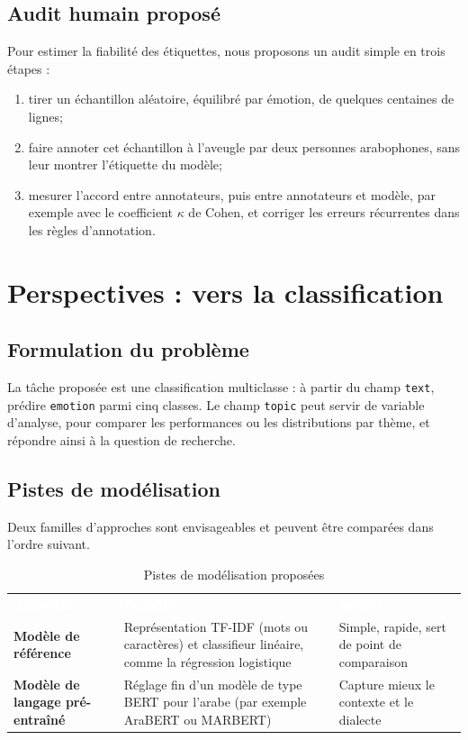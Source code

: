 \documentclass[11pt,a4paper]{article}
\newcommand{\headtab}[1]{\textcolor{white}{\sffamily\bfseries #1}}
\begin{document}
\subsection{Audit humain proposé}
Pour estimer la fiabilité des étiquettes, nous proposons un audit simple en trois étapes :
\begin{enumerate}
  \item tirer un échantillon aléatoire, équilibré par émotion, de quelques centaines de lignes;
  \item faire annoter cet échantillon à l'aveugle par deux personnes arabophones, sans leur montrer l'étiquette du modèle;
  \item mesurer l'accord entre annotateurs, puis entre annotateurs et modèle, par exemple avec le coefficient $\kappa$ de Cohen, et corriger les erreurs récurrentes dans les règles d'annotation.
\end{enumerate}

\section{Perspectives : vers la classification}
\label{sec:perspectives}
\subsection{Formulation du problème}
La tâche proposée est une classification multiclasse : à partir du champ \texttt{text}, prédire \texttt{emotion} parmi cinq classes. Le champ \texttt{topic} peut servir de variable d'analyse, pour comparer les performances ou les distributions par thème, et répondre ainsi à la question de recherche.

\subsection{Pistes de modélisation}
Deux familles d'approches sont envisageables et peuvent être comparées dans l'ordre suivant.

\begin{table}[H]
\centering
\caption{Pistes de modélisation proposées}
\begin{tabularx}{\linewidth}{>{\sffamily\bfseries\small}p{3.4cm} X X}
\rowcolor{navy}\headtab{Approche} & \headtab{Principe} & \headtab{Intérêt} \\
Modèle de référence & Représentation TF-IDF (mots ou caractères) et classifieur linéaire, comme la régression logistique & Simple, rapide, sert de point de comparaison \\
Modèle de langage pré-entraîné & Réglage fin d'un modèle de type BERT pour l'arabe (par exemple AraBERT ou MARBERT) & Capture mieux le contexte et le dialecte \\
\bottomrule
\end{tabularx}
\end{table}
\end{document}
